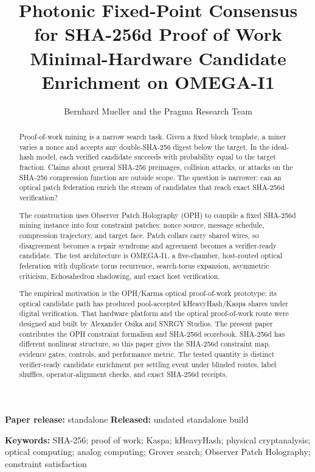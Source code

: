 \documentclass[11pt]{article}
\title{\textbf{Photonic Fixed-Point Consensus for SHA-256d Proof of Work}\\[0.25em]
\large Minimal-Hardware Candidate Enrichment on OMEGA-I1}
\author{Bernhard Mueller and the Pragma Research Team}
\date{\OPHPaperReleaseDate}
\theoremstyle{definition}
\theoremstyle{remark}
\newcommand{\OPHPaperReleaseID}{standalone}
\newcommand{\OPHPaperReleaseDate}{undated standalone build}
\begin{document}
\maketitle
\begin{center}
\small\textbf{Paper release:} \OPHPaperReleaseID\quad
\textbf{Released:} \OPHPaperReleaseDate
\end{center}

\begin{abstract}
Proof-of-work mining is a narrow search task. Given a fixed block template, a
miner varies a nonce and accepts any double-SHA-256 digest below the target. In
the ideal-hash model, each verified candidate succeeds with probability equal
to the target fraction. Claims about general SHA-256 preimages, collision
attacks, or attacks on the SHA-256 compression function are outside scope. The
question is narrower: can an optical patch federation enrich the stream of
candidates that reach exact SHA-256d verification?

The construction uses Observer Patch Holography (OPH) to compile a fixed
SHA-256d mining instance into four constraint patches: nonce source, message
schedule, compression trajectory, and target face. Patch collars carry shared
wires, so disagreement becomes a repair syndrome and agreement becomes a
verifier-ready candidate. The test architecture is OMEGA-I1, a five-chamber,
host-routed optical federation with duplicate torus recurrence, search-torus
expansion, asymmetric criticism, Echosahedron shadowing, and exact host
verification.

The empirical motivation is the OPH/Karma optical proof-of-work prototype: its
optical candidate path has produced pool-accepted kHeavyHash/Kaspa shares under
digital verification. That hardware platform and the optical proof-of-work
route were designed and built by Alexander Osika and SNRGY Studios. The present
paper contributes the OPH constraint formalism and SHA-256d scorebook.
SHA-256d has different nonlinear structure, so this paper gives the SHA-256d
constraint map, evidence gates, controls, and performance metric. The tested
quantity is distinct verifier-ready candidate enrichment per settling event
under blinded routes, label shuffles, operator-alignment checks, and exact
SHA-256d receipts.
\end{abstract}

\noindent\textbf{Keywords:} SHA-256; proof of work; Kaspa; kHeavyHash;
physical cryptanalysis; optical computing; analog computing; Grover search;
Observer Patch Holography; constraint satisfaction
\end{document}
